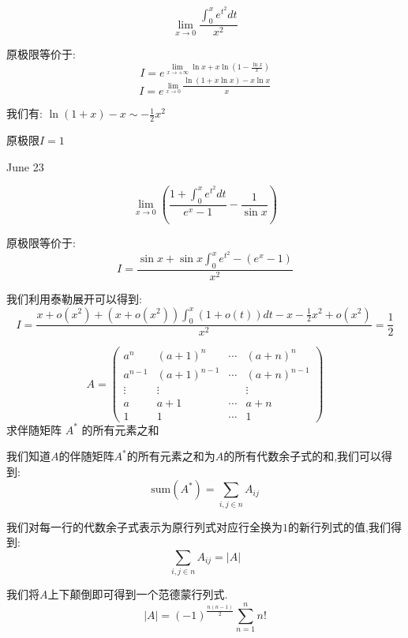 \begin{example}[][Exam: 32.4.2]
	$$\lim\limits_{x\to 0}\dfrac{\int_{0}^{x}e^{t^2}dt}{x^2}$$
\end{example}

\begin{solution}
	
	原极限等价于: 
	$$I=e^{\lim\limits_{x\to+\infty}\ln x+x\ln(1-\frac{\ln x}{x})}$$
	$$I=e^{\lim\limits_{x\to 0 }\dfrac{\ln(1+x\ln x)-x\ln x}{x}}$$
	
	我们有: $\ln(1+x)-x\sim -\frac{1}{2}x^2$
	
	原极限$I=1$
\end{solution}

\textcolor{purplea}{June 23}

\begin{example}[][Exam: 32.4.3]
	$$\lim\limits_{x\to 0}\left(\dfrac{1+\int_{0}^{x}e^{t^2}dt}{e^x-1}-\dfrac{1}{\sin x}\right)$$
\end{example}

\begin{solution}
	
	原极限等价于: 
	$$I=\dfrac{\sin x+\sin x\int_{0}^{x}e^{t^2}-(e^x-1)}{x^2}$$
	
	我们利用泰勒展开可以得到: 
	$$I=\dfrac{x+o(x^2)+(x+o(x^2))\int_{0}^{x}(1+o(t))dt-x-\frac{1}{2}x^2+o(x^2)}{x^2}=\dfrac{1}{2}$$
\end{solution}

\begin{example}[][Exam: 32.4.4]
	$$A = 
	\begin{pmatrix}
		a^n&(a+1)^n&\cdots&(a+n)^n\\
		a^{n-1}&(a+1)^{n-1}&\cdots&(a+n)^{n-1}\\
		\vdots&\vdots& &\vdots\\
		a&a+1&\cdots&a+n\\
		1&1&\cdots&1
	\end{pmatrix}$$
	求伴随矩阵 $A^{*}$ 的所有元素之和
\end{example}

\begin{solution}
	
	我们知道$A$的伴随矩阵$A^{*}$的所有元素之和为$A$的所有代数余子式的和,我们可以得到: 
	$$\text{sum}(A^{*})=\sum\limits_{i,j\in n}A_{ij}$$
	
	我们对每一行的代数余子式表示为原行列式对应行全换为$1$的新行列式的值,我们得到: 
	$$\sum\limits_{i,j\in n}A_{ij}=|A|$$
	
	我们将$A$上下颠倒即可得到一个范德蒙行列式.
	$$|A|=(-1)^{\frac{n(n-1)}{2}}\sum\limits_{n=1}^{n}n!$$
\end{solution}


